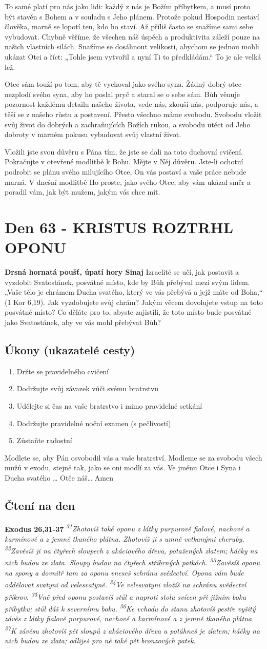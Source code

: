 \documentclass[11pt]{article}
\newcommand{\zacatekDevatyTyden}{
\textbf{Drsná hornatá poušť, úpatí hory Sinaj} \newline 
Izraelité se učí, jak postavit a vyzdobit Svatostánek, posvátné místo, kde by Bůh přebýval mezi svým lidem. „Vaše tělo je chrámem Ducha svatého, který ve vás přebývá a jejž máte od Boha,“ (1 Kor 6,19). Jak vyzdobujete svůj chrám? Jakým věcem dovolujete vstup na toto posvátné místo? Co děláte pro to, abyste zajistili, že toto místo bude posvátné jako Svatostánek, aby ve vás mohl přebývat Bůh?

\subsection*{Úkony (ukazatelé cesty)}
\begin{enumerate}
  \item Držte se pravidelného cvičení
  \item Dodržujte svůj závazek vůči svému bratrstvu
  \item Udělejte si čas na vaše bratrstvo i mimo pravidelné setkání
  \item Dodržujte pravidelné noční examen (s pečlivostí)
  \item Zůstaňte radostní
\end{enumerate}
Modlete se, aby Pán osvobodil vás a vaše bratrství. \newline
Modleme se za svobodu všech mužů v exodu, stejně tak, jako se oni modlí za vás.\newline
Ve jménu Otce i Syna i Ducha svatého …  Otče náš… Amen
}
\begin{document}
To samé platí pro nás jako lidi: každý z nás je Božím příbytkem, a musí proto být stavěn s Bohem a v souladu s Jeho plánem.
Protože pokud Hospodin nestaví člověka, marně se lopotí ten, kdo ho staví. Až příliš často se snažíme sami sebe vybudovat.
Chybně věříme, že všechen náš úspěch a produktivita záleží pouze na našich vlastních silách. Snažíme se dosáhnout velikosti,
abychom se jednou mohli ukázat Otci a říct: „Tohle jsem vytvořil a nyní Ti to předkládám.“ To je ale velká lež.

Otec sám touží po tom, aby tě vychoval jako svého syna. Žádný dobrý otec nezplodí svého syna, aby ho poslal pryč a staral se o
sebe sám. Bůh věnuje pozornost každému detailu našeho života, vede nás, zkouší nás, podporuje nás, a těší se z našeho růstu a
postavení. Přesto všechno máme svobodu. Svobodu vložit svůj život do dobrých a zachraňujících Božích rukou, a svobodu utéct od
Jeho dobroty v marném pokusu vybudovat svůj vlastní život.

Vložili jste svou důvěru s Pána tím, že jste se dali na toto duchovní cvičení. Pokračujte v otevřené modlitbě k Bohu. Mějte v Něj
důvěru. Jste-li ochotní podrobit se plánu svého milujícího Otce, On vás postaví a vaše práce nebude marná. V dnešní modlitbě Ho
proste, jako svého Otce, aby vám ukázal směr a poradil vám, jak být mužem, jakým vás chce mít.


\newpage
\section{Den 63 - KRISTUS ROZTRHL OPONU}
\zacatekDevatyTyden
\subsection*{Čtení na den}
\textbf{Exodus 26,31-37}
\newline
\textit{
\textsuperscript{31}Zhotovíš také oponu z látky purpurově fialové, nachové a karmínové a z jemně tkaného plátna. Zhotovíš ji s umně vetkanými cheruby.
\textsuperscript{32}Zavěsíš ji na čtyřech sloupech z akáciového dřeva, potažených zlatem; háčky na nich budou ze zlata. Sloupy budou na čtyřech stříbrných patkách.
\textsuperscript{33}Zavěsíš oponu na spony a dovnitř tam za oponu vneseš schránu svědectví. Opona vám bude oddělovat svatyni od velesvatyně.
\textsuperscript{34}Ve velesvatyni vložíš na schránu svědectví příkrov.
\textsuperscript{35}Vně před oponu postavíš stůl a naproti stolu svícen při jižním boku příbytku; stůl dáš k severnímu boku.
\textsuperscript{36}Ke vchodu do stanu zhotovíš pestře vyšitý závěs z látky fialově purpurové, nachové a karmínové a z jemně tkaného plátna.
\textsuperscript{37}K závěsu zhotovíš pět sloupů z akáciového dřeva a potáhneš je zlatem; háčky na nich budou ze zlata; odliješ pro ně také pět bronzových patek.
}
\end{document}
